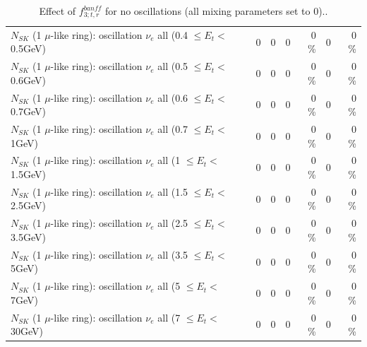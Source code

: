 \begin{table}
\begin{tabular}{| l | r | r | r  r | r  r |}
$N_{SK}$ (1 $\mu$-like ring): oscillation $\nu_{e}$ all (0.4 $\leq E_{t} <$ 0.5GeV) &               0 &               0 &               0 &        0 \%  &               0 &        0 \%  \\ 
$N_{SK}$ (1 $\mu$-like ring): oscillation $\nu_{e}$ all (0.5 $\leq E_{t} <$ 0.6GeV) &               0 &               0 &               0 &        0 \%  &               0 &        0 \%  \\ 
$N_{SK}$ (1 $\mu$-like ring): oscillation $\nu_{e}$ all (0.6 $\leq E_{t} <$ 0.7GeV) &               0 &               0 &               0 &        0 \%  &               0 &        0 \%  \\ 
$N_{SK}$ (1 $\mu$-like ring): oscillation $\nu_{e}$ all (0.7 $\leq E_{t} <$ 1GeV) &               0 &               0 &               0 &        0 \%  &               0 &        0 \%  \\ 
$N_{SK}$ (1 $\mu$-like ring): oscillation $\nu_{e}$ all (1 $\leq E_{t} <$ 1.5GeV) &               0 &               0 &               0 &        0 \%  &               0 &        0 \%  \\ 
$N_{SK}$ (1 $\mu$-like ring): oscillation $\nu_{e}$ all (1.5 $\leq E_{t} <$ 2.5GeV) &               0 &               0 &               0 &        0 \%  &               0 &        0 \%  \\ 
$N_{SK}$ (1 $\mu$-like ring): oscillation $\nu_{e}$ all (2.5 $\leq E_{t} <$ 3.5GeV) &               0 &               0 &               0 &        0 \%  &               0 &        0 \%  \\ 
$N_{SK}$ (1 $\mu$-like ring): oscillation $\nu_{e}$ all (3.5 $\leq E_{t} <$ 5GeV) &               0 &               0 &               0 &        0 \%  &               0 &        0 \%  \\ 
 $N_{SK}$ (1 $\mu$-like ring): oscillation $\nu_{e}$ all (5 $\leq E_{t} <$ 7GeV) &               0 &               0 &               0 &        0 \%  &               0 &        0 \%  \\ 
$N_{SK}$ (1 $\mu$-like ring): oscillation $\nu_{e}$ all (7 $\leq E_{t} <$ 30GeV) &               0 &               0 &               0 &        0 \%  &               0 &        0 \%  \\ 
\hline
\hline
\end{tabular}
\caption{ Effect of $f_{3; t, r}^{banff}$ for no oscillations (all mixing parameters set to 0).. }
\label{tab:num_banff_03_1RmuT_3f_osc_t13:0}
\end{table}
\clearpage
